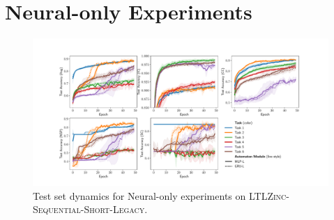 \section{Neural-only Experiments}
\begin{figure}[htb!]
	\centering
	\includegraphics[width=\linewidth]{imgs/ijcai/task_validation.pdf}
	\caption[Neural-only experiments on \textsc{LTLZinc-Sequential-Short-Legacy}]{Test set dynamics for Neural-only experiments on \textsc{LTLZinc-Sequential-Short-Legacy}.}
	\label{fig:neural-only}
\end{figure}

